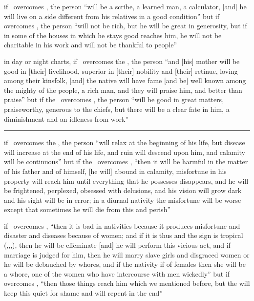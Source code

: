 \begin{description}[style=multiline,leftmargin=1.5cm]
\item[\Jupiter\Square\Mercury] if \Jupiter\, overcomes \Mercury, the person ``will be a scribe, a learned man, a calculator, [and] he will live on a side different from his relatives in a good condition'' but if \Mercury\, overcomes \Jupiter, the person ``will not be rich, but he will be great in generosity, but if in some of the houses in which he stays good reaches him, he will not be charitable in his work and will not be thankful to people''

\item[\Jupiter\Square\Moon] in day or night charts, if \Jupiter\, overcomes the \Moon, the person ``and [his] mother will be good in [their] livelihood, superior in [their] nobility and [their] retinue, loving among their kinsfolk, [and] the native will have fame [and be] well known among the mighty of the people, a rich man, and they will praise him, and better than praise'' but if the \Moon\, overcomes \Jupiter, the person ``will be good in great matters, praiseworthy, generous to the chiefs, but there will be a clear fate in him, a diminishment and an idleness from work''

\vspace{0.5em}\hrule
\item[\Mars\Square\Sun] if \Mars\, overcomes the \Sun, the person ``will relax at the beginning of his life, but disease will increase at the end of his life, and ruin will descend upon him, and calamity will be continuous'' but if the \Sun\, overcomes \Mars, ``then it will be harmful in the matter of his father and of himself, [he will] abound in calamity, misfortune in his property will reach him until everything that he possesses disappears, and he will be frightened, perplexed, obsessed with delusions, and his vision will grow dark and his sight will be in error; in a diurnal nativity the misfortune will be worse except that sometimes he will die from this and perish''

\item[\Mars\Square\Venus] if \Mars\, overcomes \Venus, ``then it is bad in nativities because it produces misfortune and disaster and diseases because of women; and if it is thus and the sign is tropical (\Aries,\Cancer,\Libra,\Capricorn), then he will be effeminate [and] he will perform this vicious act, and if marriage is judged for him, then he will marry slave girls and disgraced women or he will be debauched by whores, and if the nativity if of females then she will be a whore, one of the women who have intercourse with men wickedly'' but if \Venus\, overcomes \Mars, ``then those things reach him which we mentioned before, but the will keep this quiet for shame and will repent in the end''


\end{description}
